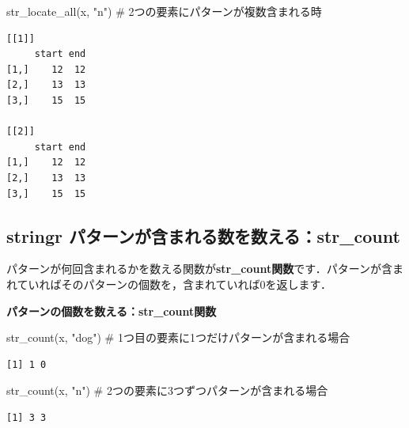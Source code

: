\documentclass[
  letterpaper,
  DIV=11,
  numbers=noendperiod]{scrreprt}
\newenvironment{Shaded}{\begin{snugshade}}{\end{snugshade}}
\newcommand{\CommentTok}[1]{\textcolor[rgb]{0.37,0.37,0.37}{#1}}
\newcommand{\FunctionTok}[1]{\textcolor[rgb]{0.28,0.35,0.67}{#1}}
\newcommand{\NormalTok}[1]{\textcolor[rgb]{0.00,0.23,0.31}{#1}}
\newcommand{\StringTok}[1]{\textcolor[rgb]{0.13,0.47,0.30}{#1}}
\begin{document}
\begin{Shaded}
\begin{Highlighting}[]
\FunctionTok{str\_locate\_all}\NormalTok{(x, }\StringTok{"n"}\NormalTok{) }\CommentTok{\# 2つの要素にパターンが複数含まれる時}
\end{Highlighting}
\end{Shaded}

\begin{verbatim}
[[1]]
     start end
[1,]    12  12
[2,]    13  13
[3,]    15  15

[[2]]
     start end
[1,]    12  12
[2,]    13  13
[3,]    15  15
\end{verbatim}

\hypertarget{stringr-ux30d1ux30bfux30fcux30f3ux304cux542bux307eux308cux308bux6570ux3092ux6570ux3048ux308bstr_count}{%
\subsection{stringr
パターンが含まれる数を数える：str\_count}\label{stringr-ux30d1ux30bfux30fcux30f3ux304cux542bux307eux308cux308bux6570ux3092ux6570ux3048ux308bstr_count}}

パターンが何回含まれるかを数える関数が\textbf{str\_count関数}です．パターンが含まれていればそのパターンの個数を，含まれていれば0を返します．

\textbf{パターンの個数を数える：str\_count関数}

\begin{Shaded}
\begin{Highlighting}[]
\FunctionTok{str\_count}\NormalTok{(x, }\StringTok{"dog"}\NormalTok{) }\CommentTok{\# 1つ目の要素に1つだけパターンが含まれる場合}
\end{Highlighting}
\end{Shaded}

\begin{verbatim}
[1] 1 0
\end{verbatim}

\begin{Shaded}
\begin{Highlighting}[]
\FunctionTok{str\_count}\NormalTok{(x, }\StringTok{"n"}\NormalTok{) }\CommentTok{\# 2つの要素に3つずつパターンが含まれる場合}
\end{Highlighting}
\end{Shaded}

\begin{verbatim}
[1] 3 3
\end{verbatim}
\end{document}
